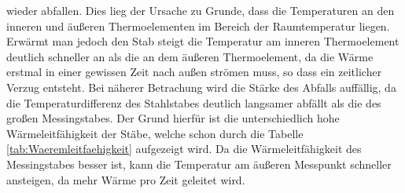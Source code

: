wieder abfallen. Dies lieg der Ursache zu Grunde, dass die Temperaturen an den inneren und äußeren Thermoelementen im Bereich der Raumtemperatur liegen. 
Erwärmt man jedoch den Stab steigt die Temperatur am inneren  Thermoelement deutlich schneller an als die an dem äußeren Thermoelement, da die Wärme erstmal
in einer gewissen Zeit nach außen strömen muss, so dass ein zeitlicher Verzug entsteht. Bei näherer Betrachung wird die Stärke des Abfalls auffällig, da die
Temperaturdifferenz des Stahlstabes deutlich langsamer abfällt als die des großen Messingstabes. Der Grund hierfür ist die unterschiedlich hohe
Wärmeleitfähigkeit der Stäbe, welche schon durch die Tabelle \eqref{tab:Waeremleitfaehigkeit} aufgezeigt wird. Da die Wärmeleitfähigkeit des
Messingstabes besser ist, kann die Temperatur am äußeren Messpunkt schneller ansteigen, da mehr Wärme pro Zeit geleitet wird.

